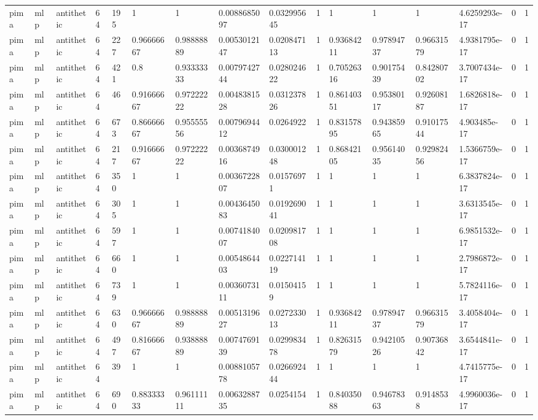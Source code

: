 \begin{tabular}{llllllllllllllll}
pima & mlp & antithetic & 64 & 195 & 1 & 1 & 0.0088685097 & 0.032995645 & 1 & 1 & 1 & 1 & 4.6259293e-17 & 0 & 1 \\
pima & mlp & antithetic & 64 & 227 & 0.96666667 & 0.98888889 & 0.0053012147 & 0.020847113 & 1 & 0.93684211 & 0.97894737 & 0.96631579 & 4.9381795e-17 & 0 & 1 \\
pima & mlp & antithetic & 64 & 421 & 0.8 & 0.93333333 & 0.0079742744 & 0.028024622 & 1 & 0.70526316 & 0.90175439 & 0.84280702 & 3.7007434e-17 & 0 & 1 \\
pima & mlp & antithetic & 64 & 46 & 0.91666667 & 0.97222222 & 0.0048381528 & 0.031237826 & 1 & 0.86140351 & 0.95380117 & 0.92608187 & 1.6826818e-17 & 0 & 1 \\
pima & mlp & antithetic & 64 & 673 & 0.86666667 & 0.95555556 & 0.0079694412 & 0.0264922 & 1 & 0.83157895 & 0.94385965 & 0.91017544 & 4.903485e-17 & 0 & 1 \\
pima & mlp & antithetic & 64 & 217 & 0.91666667 & 0.97222222 & 0.0036874916 & 0.030001248 & 1 & 0.86842105 & 0.95614035 & 0.92982456 & 1.5366759e-17 & 0 & 1 \\
pima & mlp & antithetic & 64 & 350 & 1 & 1 & 0.0036722807 & 0.01576971 & 1 & 1 & 1 & 1 & 6.3837824e-17 & 0 & 1 \\
pima & mlp & antithetic & 64 & 305 & 1 & 1 & 0.0043645083 & 0.019269041 & 1 & 1 & 1 & 1 & 3.6313545e-17 & 0 & 1 \\
pima & mlp & antithetic & 64 & 597 & 1 & 1 & 0.0074184007 & 0.020981708 & 1 & 1 & 1 & 1 & 6.9851532e-17 & 0 & 1 \\
pima & mlp & antithetic & 64 & 660 & 1 & 1 & 0.0054864403 & 0.022714119 & 1 & 1 & 1 & 1 & 2.7986872e-17 & 0 & 1 \\
pima & mlp & antithetic & 64 & 739 & 1 & 1 & 0.0036073111 & 0.01504159 & 1 & 1 & 1 & 1 & 5.7824116e-17 & 0 & 1 \\
pima & mlp & antithetic & 64 & 630 & 0.96666667 & 0.98888889 & 0.0051319627 & 0.027233013 & 1 & 0.93684211 & 0.97894737 & 0.96631579 & 3.4058404e-17 & 0 & 1 \\
pima & mlp & antithetic & 64 & 497 & 0.81666667 & 0.93888889 & 0.0074769139 & 0.029983478 & 1 & 0.82631579 & 0.94210526 & 0.90736842 & 3.6544841e-17 & 0 & 1 \\
pima & mlp & antithetic & 64 & 39 & 1 & 1 & 0.0088105778 & 0.026692444 & 1 & 1 & 1 & 1 & 4.7415775e-17 & 0 & 1 \\
pima & mlp & antithetic & 64 & 690 & 0.88333333 & 0.96111111 & 0.0063288735 & 0.0254154 & 1 & 0.84035088 & 0.94678363 & 0.9148538 & 4.9960036e-17 & 0 & 1 \\

\end{tabular}
